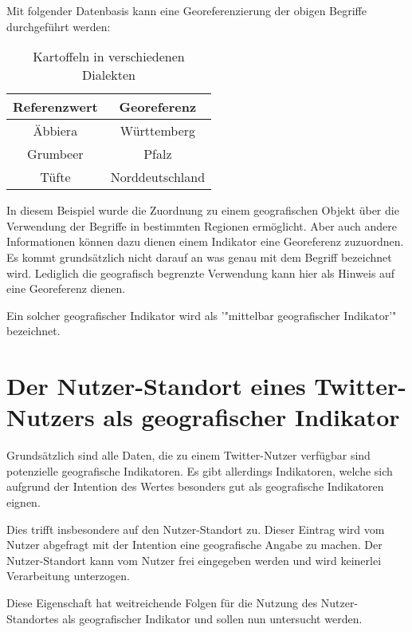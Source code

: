				Mit folgender Datenbasis kann eine Georeferenzierung der obigen Begriffe durchgeführt werden:

				\begin{table}[htpb]
					\caption{Kartoffeln in verschiedenen Dialekten} 
					\centering
					\begin{tabular}{|c|c|}
						\hline
						Referenzwert & Georeferenz \\
						\hline\hline
						Äbbiera & Württemberg \\
						\hline
						Grumbeer & Pfalz \\
						\hline
						Tüfte & Norddeutschland \\
						\hline
					\end{tabular}
					\label{tab:dialekt} 
				\end{table} 

				In diesem Beispiel wurde die Zuordnung zu einem geografischen Objekt über die Verwendung der Begriffe in bestimmten Regionen ermöglicht.
				Aber auch andere Informationen können dazu dienen einem Indikator eine Georeferenz zuzuordnen.
				Es kommt grundsätzlich nicht darauf an was genau mit dem Begriff bezeichnet wird. 
				Lediglich die geografisch begrenzte Verwendung kann hier als Hinweis auf eine Georeferenz dienen. 

				Ein solcher geografischer Indikator wird als '"mittelbar geografischer Indikator'" bezeichnet. 

	\section{Der Nutzer-Standort eines Twitter-Nutzers als geografischer Indikator} \label{sec:nutzerStandort} 

				Grundsätzlich sind alle Daten, die zu einem Twitter-Nutzer verfügbar sind potenzielle geografische Indikatoren.
				Es gibt allerdings Indikatoren, welche sich aufgrund der Intention des Wertes besonders gut als geografische Indikatoren eignen.

				Dies trifft insbesondere auf den Nutzer-Standort zu.
				Dieser Eintrag wird vom Nutzer abgefragt mit der Intention eine geografische Angabe zu machen. 
				Der Nutzer-Standort kann vom Nutzer frei eingegeben werden und wird keinerlei Verarbeitung unterzogen.

				Diese Eigenschaft hat weitreichende Folgen für die Nutzung des Nutzer-Standortes als geografischer Indikator und sollen nun untersucht werden.

